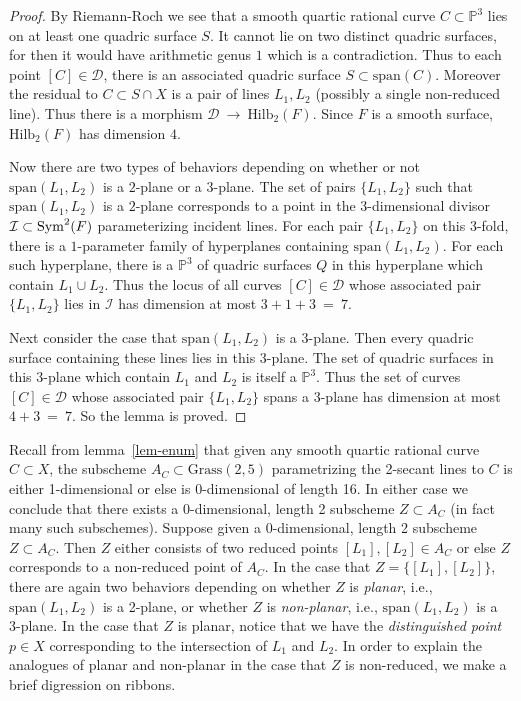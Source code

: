 \documentclass[twoside,12pt,reqno]{amsart}
\theoremstyle{plain}
\theoremstyle{definition}
\newcommand{\PP}{\mathbb{P}}
\newcommand{\HI}[2]{\text{Hilb}_{#1}(#2)}
\newcommand{\Hi}[1]{\text{Hilb}_{#1}}
\def\Sym{{\rm Sym}}
\def\ps{\vspace{4pt}}
\begin{document}
\begin{proof}
By Riemann-Roch we see that a smooth quartic rational curve $C\subset
\PP^3$ lies on at least one quadric surface $S$.  It cannot lie on two 
distinct quadric surfaces, for then it would have arithmetic genus $1$ 
which is a contradiction.  Thus to each point $[C]\in \mathcal{D}$,
there is an associated quadric surface $S\subset \text{span}(C)$.
Moreover the residual to $C\subset S\cap X$ is a pair of lines $L_1,
L_2$ (possibly a single non-reduced line).  Thus there is a morphism
$\mathcal{D} ~\rightarrow~ \HI{2}{F}$.  Since $F$ is a smooth surface,
$\Hi{2}(F)$ has dimension $4$.  

\ps

Now there are two types of behaviors depending on whether or not
$\text{span}(L_1,L_2)$ is a $2$-plane or a $3$-plane.  The set of
pairs $\{L_1,L_2\}$ such that $\text{span}(L_1,L_2)$ is a $2$-plane
corresponds to a point in the $3$-dimensional divisor $\mathcal{I}
\subset \Sym^2(F)$ parameterizing incident lines.
For each pair $\{L_1,L_2\}$ on this $3$-fold, there
is a $1$-parameter family of hyperplanes containing
$\text{span}(L_1,L_2)$.  For each such hyperplane, there is a $\PP^3$
of quadric surfaces $Q$ in this hyperplane which contain $L_1\cup
L_2$.  Thus the locus of all curves $[C]\in \mathcal{D}$ whose
associated pair $\{L_1,L_2\}$ lies in $\mathcal{I}$ has dimension at
most $3+1+3~=~7$.  

\ps

Next consider the case that $\text{span}(L_1,L_2)$ is a $3$-plane.
Then every quadric surface containing these lines lies in this
$3$-plane.  The set of quadric surfaces in this $3$-plane which
contain $L_1$ and $L_2$ is itself a $\PP^3$.  Thus the set of curves
$[C]\in \mathcal{D}$ whose associated pair $\{L_1,L_2\}$ spans a
$3$-plane has dimension at most $4+3~=~7$.  So the lemma is proved.
\end{proof}

Recall from lemma~\ref{lem-enum} that given any smooth quartic
rational curve $C\subset X$, the subscheme $A_C\subset
\text{Grass}(2,5)$ parametrizing the 2-secant lines to $C$ is either
1-dimensional or else is 0-dimensional of length 16.  In either case
we conclude that there exists a 0-dimensional, length 2 subscheme
$Z\subset A_C$ (in fact many such subschemes).
Suppose given a 0-dimensional, length 2 subscheme $Z\subset A_C$.
Then $Z$ either consists of two reduced points $[L_1],[L_2]\in A_C$ or 
else $Z$ corresponds to a non-reduced point of $A_C$.  
In the case that $Z=\{[L_1],[L_2]\}$, there are again two behaviors
depending on whether $Z$ is \emph{planar}, i.e., $\text{span}(L_1,L_2)$ 
is a 2-plane, or whether $Z$ is \emph{non-planar},
i.e., $\text{span}(L_1,L_2)$ is a 3-plane.  In the case that $Z$ is
planar, notice that we have the \emph{distinguished point} $p\in X$
corresponding to the intersection of $L_1$ and $L_2$.  
In order to explain the
analogues of planar and non-planar in the case that $Z$ is
non-reduced, we make a brief digression on ribbons.
\end{document}
